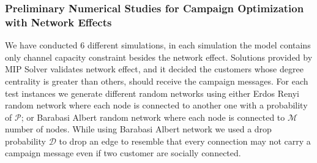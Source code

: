 \documentclass[11pt]{article}
\begin{document}
\subsubsection*{Preliminary Numerical Studies for Campaign Optimization with Network Effects}
We have conducted 6 different simulations, in each simulation the model contains only channel capacity constraint besides the network effect. Solutions provided by MIP Solver validates network effect, and it decided the customers whose degree centrality is greater than others, should receive the campaign messages. For each test instances we generate different random networks using either Erdos Renyi random network where each node is connected to another one with a probability of ${\mathcal{P}}$; or Barabasi Albert random network where each node is connected to ${\mathcal{M}}$ number of nodes. While using Barabasi Albert network we used a drop probability ${\mathcal{D}}$ to drop an edge to resemble that every connection may not carry a campaign message even if two customer are socially connected.\\
\end{document}
